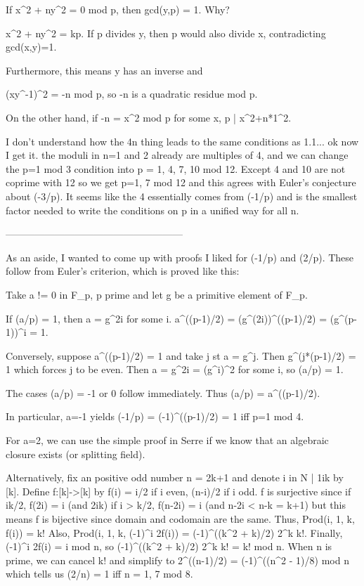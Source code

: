 If x^2 + ny^2 = 0 mod p, then gcd(y,p) = 1. Why?

x^2 + ny^2 = kp. If p divides y, then p would also divide x,
contradicting gcd(x,y)=1.

Furthermore, this means y has an inverse and

(xy^-1)^2 = -n mod p, so -n is a quadratic residue mod p.

On the other hand, if -n = x^2 mod p for some x, p | x^2+n*1^2.

I don't understand how the 4n thing leads to the same conditions as 1.1... ok now I get it. the moduli in n=1 and 2 already are multiples of 4, and we can change the p=1 mod 3 condition into p = 1, 4, 7, 10 mod 12. Except 4 and 10 are not coprime with 12 so we get p=1, 7 mod 12 and this agrees with Euler's conjecture about (-3/p). It seems like the 4 essentially comes from (-1/p) and is the smallest factor needed to write the conditions on p in a unified way for all n.

------------------------------------------------------

As an aside, I wanted to come up with proofs I liked for (-1/p) and (2/p). These follow from Euler's criterion, which is proved like this:

  Take a != 0 in F_p, p prime and let g be a primitive element of F_p.

  If (a/p) = 1, then a = g^{2i} for some i.
  a^((p-1)/2) = (g^(2i))^((p-1)/2) = (g^(p-1))^i = 1.

  Conversely, suppose a^((p-1)/2) = 1 and take j st a = g^j.
  Then g^(j*(p-1)/2) = 1 which forces j to be even. Then a = g^2i = (g^i)^2 for some i, so (a/p) = 1.

  The cases (a/p) = -1 or 0 follow immediately. Thus (a/p) = a^((p-1)/2).

In particular, a=-1 yields (-1/p) = (-1)^((p-1)/2) = 1 iff p=1 mod 4.

For a=2, we can use the simple proof in Serre if we know that an algebraic closure exists (or splitting field).

Alternatively, fix an positive odd number n = 2k+1 and denote {i in N | 1\leq i\leq k} by [k].
Define f:[k]->[k] by f(i) = i/2 if i even, (n-i)/2 if i odd.
f is surjective since if i\leq k/2, f(2i) = i (and 2i\leq k)
                      if i > k/2, f(n-2i) = i (and n-2i < n-k = k+1)
but this means f is bijective since domain and codomain are the same.
Thus, Prod(i, 1, k, f(i)) = k!
Also, Prod(i, 1, k, (-1)^i 2f(i)) = (-1)^((k^2 + k)/2) 2^k k!.
Finally, (-1)^i 2f(i) = i mod n, so (-1)^((k^2 + k)/2) 2^k k! = k! mod n.
When n is prime, we can cancel k! and simplify to
2^((n-1)/2) = (-1)^((n^2 - 1)/8) mod n which tells us (2/n) = 1 iff n = 1, 7 mod 8.

